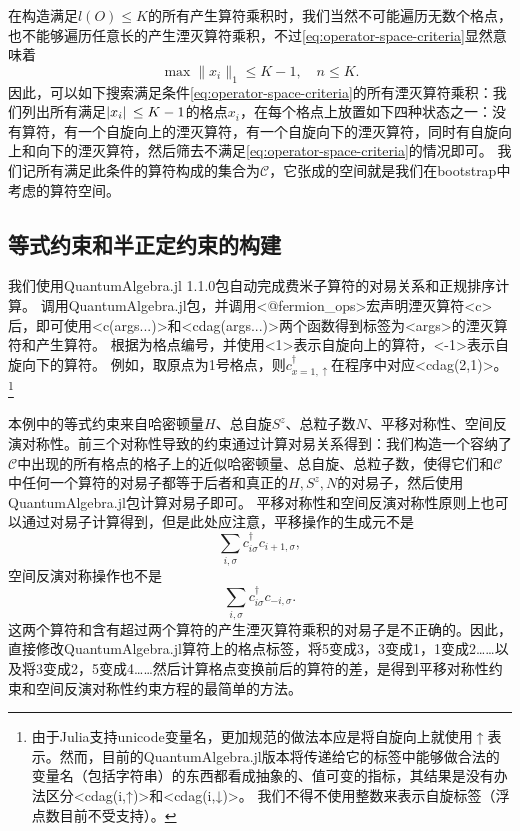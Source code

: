 \documentclass[oneside]{fduthesis}
\def\texttt#1{<#1>}%
\begin{document}
在构造满足$l(O) \leq K$的所有产生算符乘积时，我们当然不可能遍历无数个格点，也不能够遍历任意长的产生湮灭算符乘积，不过\eqref{eq:operator-space-criteria}显然意味着
\begin{equation}
    \max \| x_i \|_1 \leq K - 1, \quad n \leq K.
    \label{eq:inequality-hubbard-opstr}
\end{equation}
因此，可以如下搜索满足条件\eqref{eq:operator-space-criteria}的所有湮灭算符乘积：我们列出所有满足$\abs*{x_i} \leq K - 1$的格点$x_i$，在每个格点上放置如下四种状态之一：没有算符，有一个自旋向上的湮灭算符，有一个自旋向下的湮灭算符，同时有自旋向上和向下的湮灭算符，然后筛去不满足\eqref{eq:operator-space-criteria}的情况即可。
我们记所有满足此条件的算符构成的集合为$\mathcal{C}$，它张成的空间就是我们在bootstrap中考虑的算符空间。

\subsection{等式约束和半正定约束的构建}\label{sec:symbolic-hubbard}

我们使用QuantumAlgebra.jl 1.1.0包\cite{Sanchez-Barquilla2020,QuantumAlgebra.jl}自动完成费米子算符的对易关系和正规排序计算。
调用QuantumAlgebra.jl包，并调用\texttt{@fermion\_ops}宏声明湮灭算符\texttt{c}后，即可使用\texttt{c(args...)}和\texttt{cdag(args...)}两个函数得到标签为\texttt{args}的湮灭算符和产生算符。
根据为格点编号，并使用\texttt{1}表示自旋向上的算符，\texttt{-1}表示自旋向下的算符。
例如，取原点为1号格点，则$c^\dagger_{x = 1, \uparrow}$在程序中对应\texttt{cdag(2,1)}。%
\footnote{
    由于Julia支持unicode变量名，更加规范的做法本应是将自旋向上就使用$\uparrow$表示。然而，目前的QuantumAlgebra.jl版本将传递给它的标签中能够做合法的变量名（包括字符串）的东西都看成抽象的、值可变的指标，其结果是没有办法区分\texttt{cdag(i,↑)}和\texttt{cdag(i,↓)}。
    我们不得不使用整数来表示自旋标签（浮点数目前不受支持）。
}%

本例中的等式约束来自哈密顿量$H$、总自旋$S^z$、总粒子数$N$、平移对称性、空间反演对称性。前三个对称性导致的约束通过计算对易关系得到：我们构造一个容纳了$\mathcal{C}$中出现的所有格点的格子上的近似哈密顿量、总自旋、总粒子数，使得它们和$\mathcal{C}$中任何一个算符的对易子都等于后者和真正的$H, S^z, N$的对易子，然后使用QuantumAlgebra.jl包计算对易子即可。
平移对称性和空间反演对称性原则上也可以通过对易子计算得到，但是此处应注意，平移操作的生成元不是
\[
    \sum_{i, \sigma} c^\dagger_{i \sigma} c_{i + 1, \sigma},
\]
空间反演对称操作也不是
\[
    \sum_{i, \sigma} c^\dagger_{i \sigma} c_{-i, \sigma}.
\]
这两个算符和含有超过两个算符的产生湮灭算符乘积的对易子是不正确的。因此，直接修改QuantumAlgebra.jl算符上的格点标签，将5变成3，3变成1，1变成2……以及将3变成2，5变成4……然后计算格点变换前后的算符的差，是得到平移对称性约束和空间反演对称性约束方程的最简单的方法。
\end{document}

